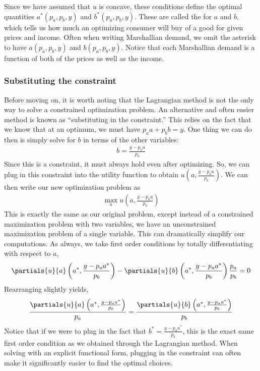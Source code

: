 Since we have assumed that $u$ is concave, these conditions define the optimal quantities $a^*(p_a, p_b, y)$ and $b^*(p_a, p_b, y)$. These are called the  for $a$ and $b$, which tells us how much an optimizing consumer will buy of a good for given prices and income. Often when writing Marshallian demand, we omit the asterisk to have $a(p_a, p_b, y)$ and $b(p_a, p_b, y)$. Notice that each Marshallian demand is a function of both of the prices as well as the income.

\subsubsection*{Substituting the constraint}
Before moving on, it is worth noting that the Lagrangian method is not the only way to solve a constrained optimization problem. An alternative and often easier method is known as ``substituting in the constraint.'' This relies on the fact that we know that at an optimum, we must have $p_a a + p_b b = y$. One thing we can do then is simply solve for $b$ in terms of the other variables:
\begin{align*}
b = \frac{y - p_a a}{p_b}
\end{align*}
Since this is a constraint, it must always hold even after optimizing. So, we can plug in this constraint into the utility function to obtain $u\left(a, \frac{y - p_a a}{p_b}\right)$. We can then write our new optimization problem as
\begin{align*}
    \max_{a} u\left(a, \frac{y - p_a a}{p_b}\right)
\end{align*}
This is exactly the same as our original problem, except instead of a constrained maximization problem with two variables, we have an unconstrained maximization problem of a single variable. This can dramatically simplify our computations. As always, we take first order conditions by totally differentiating with respect to $a$, 
\begin{align*}
    \partials{u}{a} \left(a^*, \frac{y - p_a a^*}{p_b}\right) - \partials{u}{b}\left(a^*, \frac{y - p_a a^*}{p_b}\right) \frac{p_a}{p_b} = 0
\end{align*}
Rearranging slightly yields,
\begin{align*}
    \frac{\partials{u}{a} \left(a^*, \frac{y - p_a a^*}{p_b}\right)}{p_a} = \frac{\partials{u}{b} \left(a^*, \frac{y - p_a a^*}{p_b}\right)}{p_b}
\end{align*}
Notice that if we were to plug in the fact that $b^* = \frac{y - p_a a^*}{p_b}$, this is the exact same first order condition as we obtained through the Lagrangian method. When solving with an explicit functional form, plugging in the constraint can often make it significantly easier to find the optimal choices.

